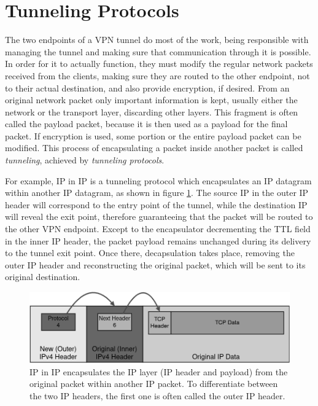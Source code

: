 \documentclass[a4paper,12pt]{report}
\begin{document}
		\section{Tunneling Protocols}
		The two endpoints of a VPN tunnel do most of the work, being responsible with managing the tunnel and making sure that communication through it is possible. In order for it to actually function, they must modify the regular network packets received from the clients, making sure they are routed to the other endpoint, not to their actual destination, and also provide encryption, if desired. From an original network packet only important information is kept, usually either the network or the transport layer, discarding other layers. This fragment is often called the payload packet, because it is then used as a payload for the final packet. If encryption is used, some portion or the entire payload packet can be modified. This process of encapsulating a packet inside another packet is called \textit{tunneling}, achieved by \textit{tunneling protocols}.
		
		For example, IP in IP \cite{rfc2003} is a tunneling protocol which encapsulates an IP datagram within another IP datagram, as shown in figure \ref{fig:ip-in-ip_packet}. The source IP in the outer IP header will correspond to the entry point of the tunnel, while the destination IP will reveal the exit point, therefore guaranteeing that the packet will be routed to the other VPN endpoint. Except to the encapsulator decrementing the TTL field in the inner IP header, the packet payload remains unchanged during its delivery to the tunnel exit point. Once there, decapsulation takes place, removing the outer IP header and reconstructing the original packet, which will be sent to its original destination.
		\begin{figure}[h]
			\includegraphics[width=\textwidth]{ip_in_ip}
			\centering
			\caption{IP in IP encapsulates the IP layer (IP header and payload) from the original packet within another IP packet. To differentiate between the two IP headers, the first one is often called the outer IP header.}
			\label{fig:ip-in-ip_packet}
		\end{figure}
		
\end{document}
